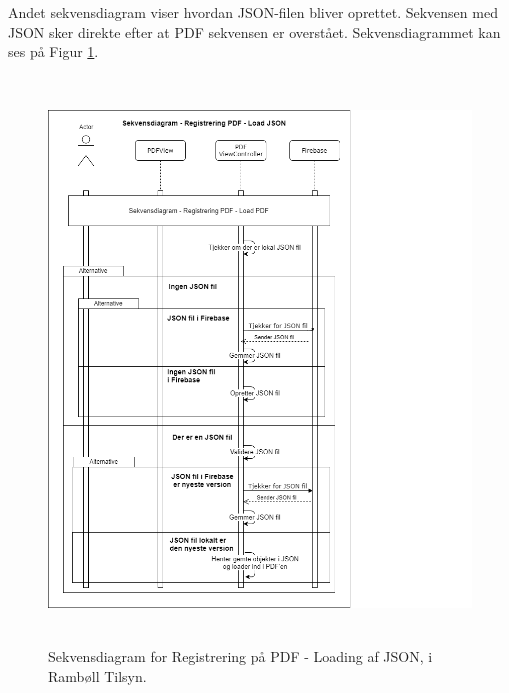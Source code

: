 Andet sekvensdiagram viser hvordan JSON-filen bliver oprettet. Sekvensen med JSON sker direkte efter at PDF sekvensen er overstået. Sekvensdiagrammet kan ses på Figur \ref{fig:LoadJSONSekvensDiagram}.
\begin{figure}[H] %
	\centering
	\includegraphics[height=15cm, width=15cm]{Design/Applikation/RegistrePDF/LoadJSONSekvensDiagram}
	\caption{Sekvensdiagram for Registrering på PDF - Loading af JSON, i Rambøll Tilsyn.}
	\label{fig:LoadJSONSekvensDiagram}
\end{figure}

\clearpage

